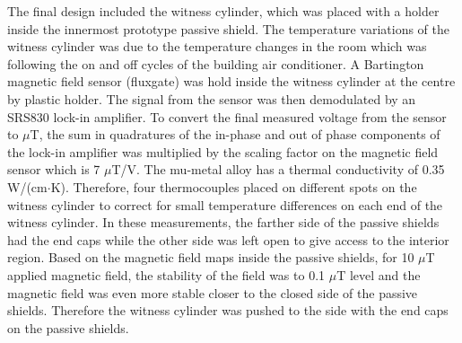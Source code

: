 The final design included the witness cylinder, which was placed with
a holder inside the innermost prototype passive shield. The
temperature variations of the witness cylinder was due to the
temperature changes in the room which was following the on and off
cycles of the building air conditioner. A Bartington magnetic field
sensor (fluxgate) was hold inside the witness cylinder at the centre
by plastic holder. The signal from the sensor was then demodulated by
an SRS830 lock-in amplifier. To convert the final measured voltage
from the sensor to $\mu$T, the sum in quadratures of the in-phase and
out of phase components of the lock-in amplifier was multiplied by the
scaling factor on the magnetic field sensor which is 7 $\mu$T/V.  The
mu-metal alloy has a thermal conductivity of 0.35
W/(cm$\cdot$K). Therefore, four thermocouples placed on different
spots on the witness cylinder to correct for small temperature
differences on each end of the witness cylinder.  In these
measurements, the farther side of the passive shields had the end caps
while the other side was left open to give access to the interior
region. Based on the magnetic field maps inside the passive shields,
for 10 $\mu$T applied magnetic field, the stability of the field was
to 0.1 $\mu$T level and the magnetic field was even more stable closer
to the closed side of the passive shields. Therefore the witness
cylinder was pushed to the side with the end caps on the passive
shields.




%
%


